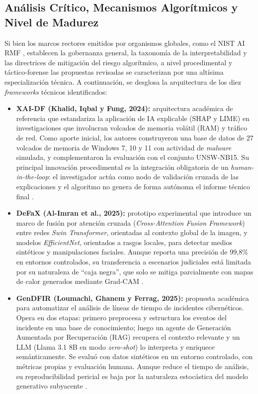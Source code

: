 \documentclass[journal]{IEEEtran}
\begin{document}
\subsection{Análisis Crítico, Mecanismos Algorítmicos y Nivel de Madurez}
Si bien los marcos rectores emitidos por organismos globales, como el NIST AI RMF \cite{NIST_AI_RMF_2023}, establecen la gobernanza general, la taxonomía de la interpretabilidad y las directrices de mitigación del riesgo algorítmico, a nivel procedimental y táctico-forense las propuestas revisadas se caracterizan por una altísima especialización técnica. A continuación, se desglosa la arquitectura de los diez \textit{frameworks} técnicos identificados:
\begin{itemize}
    \item \textbf{XAI-DF (Khalid, Iqbal y Fung, 2024):} arquitectura académica de referencia que estandariza la aplicación de IA explicable (SHAP y LIME) en investigaciones que involucran volcados de memoria volátil (RAM) y tráfico de red. Como aporte inicial, los autores construyeron una base de datos de 27 volcados de memoria de Windows 7, 10 y 11 con actividad de \textit{malware} simulada, y complementaron la evaluación con el conjunto UNSW-NB15. Su principal innovación procedimental es la integración obligatoria de un \textit{human-in-the-loop}: el investigador actúa como nodo de validación cruzada de las explicaciones y el algoritmo no genera de forma autónoma el informe técnico final \cite{KhalidZainab2024TauX}.
    \item \textbf{DeFaX (Al-Imran et al., 2025):} prototipo experimental que introduce un marco de fusión por atención cruzada (\textit{Cross-Attention Fusion Framework}) entre redes \textit{Swin Transformer}, orientadas al contexto global de la imagen, y modelos \textit{EfficientNet}, orientados a rasgos locales, para detectar medios sintéticos y manipulaciones faciales. Aunque reporta una precisión de 99,8\% en entornos controlados, su transferencia a escenarios judiciales está limitada por su naturaleza de ``caja negra'', que solo se mitiga parcialmente con mapas de calor generados mediante Grad-CAM \cite{Al-ImranMd2025DACF}.
    \item \textbf{GenDFIR (Loumachi, Ghanem y Ferrag, 2025):} propuesta académica para automatizar el análisis de líneas de tiempo de incidentes cibernéticos. Opera en dos etapas: primero preprocesa y estructura los eventos del incidente en una base de conocimiento; luego un agente de Generación Aumentada por Recuperación (RAG) recupera el contexto relevante y un LLM (Llama 3.1 8B en modo \textit{zero-shot}) lo interpreta y enriquece semánticamente. Se evaluó con datos sintéticos en un entorno controlado, con métricas propias y evaluación humana. Aunque reduce el tiempo de análisis, su reproducibilidad pericial es baja por la naturaleza estocástica del modelo generativo subyacente \cite{LoumachiFatmaYasmine2025ACIT}.

\end{itemize}
\end{document}
